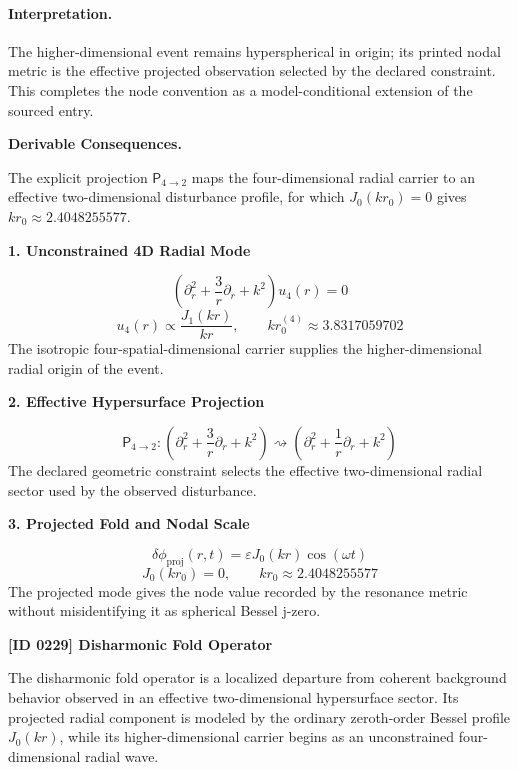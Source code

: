 \paragraph{Interpretation.}
The higher-dimensional event remains hyperspherical in origin; its printed nodal metric is the effective projected observation selected by the declared constraint. This completes the node convention as a model-conditional extension of the sourced entry.

\par\vspace{0.35em}
\noindent\textbf{Derivable Consequences.}\quad
\begingroup
\footnotesize
\raggedright
The explicit projection \(\mathsf{P}_{4\to2}\) maps the four-dimensional radial carrier to an effective two-dimensional disturbance profile, for which \(J_0(k r_0)=0\) gives \(k r_0\approx2.4048255577\).
\par\endgroup

\noindent\textbf{1. Unconstrained 4D Radial Mode}\par
\[
\left(\partial_r^2+\frac{3}{r}\partial_r+k^2\right)u_4(r)=0
\]
\[
u_4(r)\propto\frac{J_1(k r)}{k r},\qquad k r^{(4)}_0\approx3.8317059702
\]
\noindent The isotropic four-spatial-dimensional carrier supplies the higher-dimensional radial origin of the event.\par
\noindent\textbf{2. Effective Hypersurface Projection}\par
\[
\mathsf{P}_{4\to2}:\left(\partial_r^2+\frac{3}{r}\partial_r+k^2\right)\rightsquigarrow\left(\partial_r^2+\frac{1}{r}\partial_r+k^2\right)
\]
\noindent The declared geometric constraint selects the effective two-dimensional radial sector used by the observed disturbance.\par
\noindent\textbf{3. Projected Fold and Nodal Scale}\par
\[
\delta\phi_{\mathrm{proj}}(r,t)=\varepsilon J_0(k r)\cos(\omega t)
\]
\[
J_0(k r_0)=0,\qquad k r_0\approx2.4048255577
\]
\noindent The projected mode gives the node value recorded by the resonance metric without misidentifying it as spherical Bessel j-zero.\par

\clearpage
\noindent\textbf{[ID 0229] Disharmonic Fold Operator}\par
\vspace{0.35em}
\begingroup\small


The disharmonic fold operator is a localized departure from coherent background behavior observed in an effective two-dimensional hypersurface sector. Its projected radial component is modeled by the ordinary zeroth-order Bessel profile \(J_0(k r)\), while its higher-dimensional carrier begins as an unconstrained four-dimensional radial wave.

